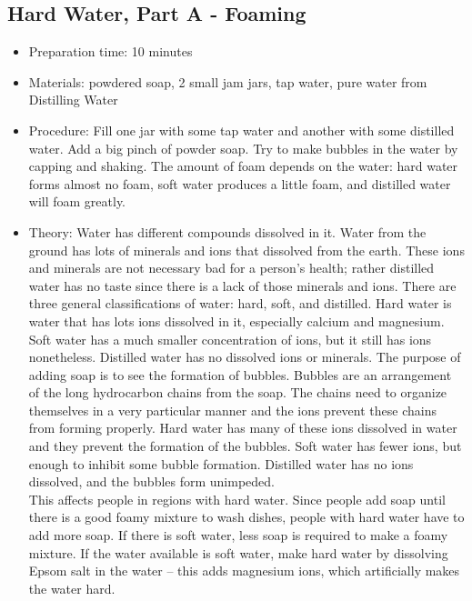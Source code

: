\subsection{Hard Water, Part A - Foaming}
\begin{itemize}
\item{Preparation time: 10 minutes}
\item{Materials: powdered soap, 2 small jam jars, tap water, pure water from Distilling Water}
\item{Procedure: Fill one jar with some tap water and another with some distilled water. Add a big pinch of powder soap. Try to make bubbles in the water by capping and shaking. The amount of foam depends on the water: hard water forms almost no foam, soft water produces a little foam, and distilled water will foam greatly.}
\item{Theory: Water has different compounds dissolved in it. Water from the ground has lots of minerals and ions that dissolved from the earth. These ions and minerals are not necessary bad for a person’s health; rather distilled water has no taste since there is a lack of those minerals and ions. There are three general classifications of water: hard, soft, and distilled. Hard water is water that has lots ions dissolved in it, especially calcium and magnesium. Soft water has a much smaller concentration of ions, but it still has ions nonetheless. Distilled water has no dissolved ions or minerals. The purpose of adding soap is to see the formation of bubbles. Bubbles are an arrangement of the long hydrocarbon chains from the soap. The chains need to organize themselves in a very particular manner and the ions prevent these chains from forming properly. Hard water has many of these ions dissolved in water and they prevent the formation of the bubbles. Soft water has fewer ions, but enough to inhibit some bubble formation. Distilled water has no ions dissolved, and the bubbles form unimpeded.\\
This affects people in regions with hard water. Since people add soap until there is a good foamy mixture to wash dishes, people with hard water have to add more soap. If there is soft water, less soap is required to make a foamy mixture. If the water available is soft water, make hard water by dissolving Epsom salt in the water – this adds magnesium ions, which artificially makes the water hard.}
\end{itemize}


